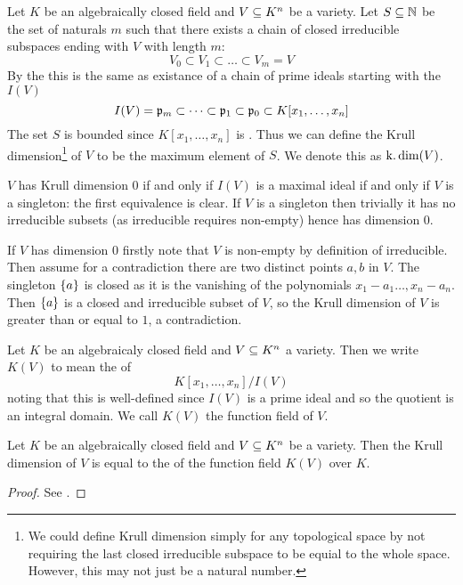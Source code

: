 \begin{dfn}
    Let $K$ be an algebraically closed field and $V \subseteq K^n$ be a variety.
    Let $S \subseteq \mathbb{N}$ be the set of naturals $m$ such that 
    there exists a chain of closed irreducible subspaces ending with $V$ with 
    length $m$:
    \[
        V_0 \subset V_1 \subset \dots \subset V_m = V
    \]
    By the 
    this is the same as existance of a chain of prime ideals starting with the 
     $I(V)$
    \[  
        I(V) = \mathfrak{p}_m \subset 
        \dots \subset \mathfrak{p}_1 \subset \mathfrak{p}_0 \subset K[x_1,\dots,x_n]
    \]
    The set $S$ is bounded since $K[x_1,\dots,x_n]$ is 
    .
    Thus we can define the Krull dimension\footnote{
        We could define Krull dimension simply for any topological space
        by not requiring the last closed irreducible subspace to be equial to 
        the whole space. 
        However, this may not just be a natural number.
    } of $V$ 
    to be the maximum element of $S$.
    We denote this as $\operatorname{k.dim}(V)$.
\end{dfn}
\begin{rmk}
    $V$ has Krull dimension $0$ if and only if $I(V)$ is a maximal ideal 
    if and only if $V$ is a singleton:
    the first equivalence is clear.
    If $V$ is a singleton then trivially it has no irreducible subsets 
    (as irreducible requires non-empty) hence has dimension $0$.

    If $V$ has dimension $0$ firstly note that $V$ is non-empty by definition
    of irreducible.
    Then assume for a contradiction there are two distinct points $a, b$ in $V$.
    The singleton $\left\{a\right\}$ is closed as it is the vanishing of the polynomials
    $x_1 - a_1 \dots, x_n - a_n$.
    Then $\left\{a\right\}$ is a closed and irreducible subset of $V$,
    so the Krull dimension of $V$ is greater than or equal to $1$,
    a contradiction.
\end{rmk}

\begin{dfn}
    Let $K$ be an algebraicaly closed field and $V \subseteq K^n$ a variety.
    Then we write $K(V)$ to mean the 
     of 
    \[K[x_1,\dots,x_n] / I(V)\]
    noting that this is well-defined since $I(V)$ is a prime ideal
    and so the quotient is an integral domain.
    We call $K(V)$ the function field of $V$.
\end{dfn}

\begin{prop}
    Let $K$ be an algebraically closed field and $V \subseteq K^n$ be a variety.
    Then the Krull dimension of $V$ is equal to the 
     of 
    the function field $K(V)$ over $K$.
\end{prop}
\begin{proof}
    See \cite{atiyah}. %
\end{proof}
